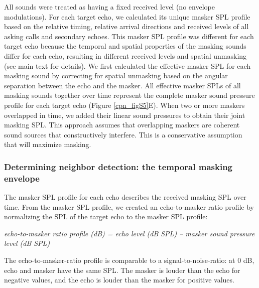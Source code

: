 \documentclass[
]{book}
\begin{document}
All sounds were treated as having a fixed received level (no envelope
modulations). For each target echo, we calculated its unique masker SPL profile
based on the relative timing, relative arrival directions and received levels of all asking calls and secondary echoes. This masker SPL profile was different for
each target echo because the temporal and spatial properties of the masking
sounds differ for each echo, resulting in different received levels and spatial
unmasking (see main text for details). We first calculated the effective masker SPL for each masking sound by correcting for spatial unmasking based on the angular separation between the echo and the masker. All effective masker SPLs of all masking sounds together over time represent the complete masker sound
pressure profile for each target echo (Figure \ref{cpn_figS5}E). When two or more maskers
overlapped in time, we added their linear sound pressures to obtain their joint
masking SPL. This approach assumes that overlapping maskers are coherent
sound sources that constructively interfere. This is a conservative assumption that will maximize masking.

\hypertarget{determining-neighbor-detection-the-temporal-masking-envelope}{%
\subsubsection{\texorpdfstring{Determining neighbor detection: the temporal masking envelope \label{cpn_detneighbour}}{Determining neighbor detection: the temporal masking envelope }}\label{determining-neighbor-detection-the-temporal-masking-envelope}}

The masker SPL profile for each echo describes the received masking SPL over
time. From the masker SPL profile, we created an echo-to-masker ratio profile by
normalizing the SPL of the target echo to the masker SPL profile:

\emph{echo-to-masker ratio profile (dB) = echo level (dB SPL) -- masker sound pressure level (dB SPL)}

The echo-to-masker-ratio profile is comparable to a signal-to-noise-ratio: at 0 dB, echo and masker have the same SPL. The masker is louder than the echo for negative values, and the echo is louder than the masker for positive values.
\end{document}
